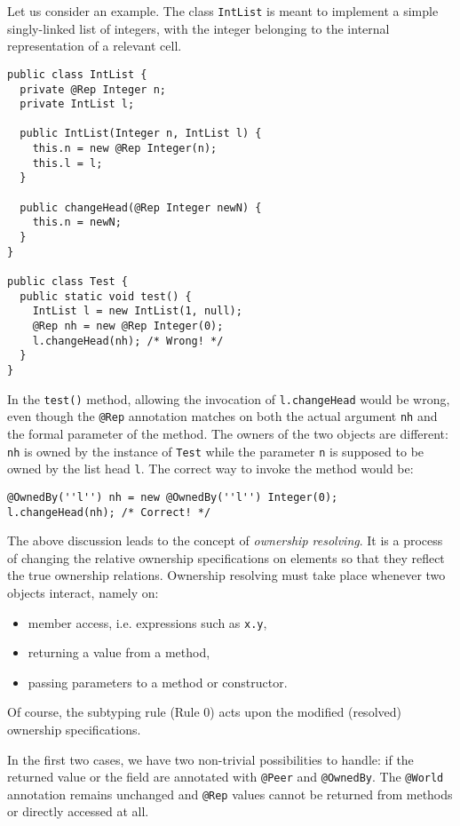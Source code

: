 \documentclass{pracamgr}
\theoremstyle{break}
\theoremstyle{break}
\theoremstyle{break}
\begin{document}
Let us consider an example. The class \texttt{IntList} is meant to
implement a simple singly-linked list of integers, with the integer
belonging to the internal representation of a relevant cell. 
\begin{lstlisting}
public class IntList {
  private @Rep Integer n;
  private IntList l;

  public IntList(Integer n, IntList l) {
    this.n = new @Rep Integer(n);
    this.l = l;
  }

  public changeHead(@Rep Integer newN) {
    this.n = newN;
  }
}

public class Test {
  public static void test() {
    IntList l = new IntList(1, null);
    @Rep nh = new @Rep Integer(0);
    l.changeHead(nh); /* Wrong! */
  }
}
\end{lstlisting}
In the \texttt{test()} method, allowing the invocation of
\texttt{l.changeHead} would be wrong, even though the \texttt{@Rep}
annotation matches on both the actual argument \texttt{nh} and the
formal parameter of the method. The owners of the two objects are
different: \texttt{nh} is owned by the instance of \texttt{Test} while
the parameter \texttt{n} is supposed to be owned by the list head
\texttt{l}. The correct way to invoke the method would be:
\begin{lstlisting}
@OwnedBy(''l'') nh = new @OwnedBy(''l'') Integer(0);
l.changeHead(nh); /* Correct! */
\end{lstlisting}

The above discussion leads to the concept of \emph{ownership
  resolving}. It is a process of changing the relative ownership
specifications on elements so that they reflect the true ownership
relations. Ownership resolving must take place whenever two objects
interact, namely on:
\begin{itemize}
\item member access, i.e. expressions such as \texttt{x.y},
\item returning a value from a method, 
\item passing parameters to a method or constructor.
\end{itemize}
Of course, the subtyping rule (Rule 0) acts upon the modified
(resolved) ownership specifications.

In the first two cases, we have two non-trivial possibilities to
handle: if the returned value or the field are annotated with
\texttt{@Peer} and \texttt{@OwnedBy}. The \texttt{@World} annotation
remains unchanged and \texttt{@Rep} values cannot be returned from
methods or directly accessed at all.
\end{document}
